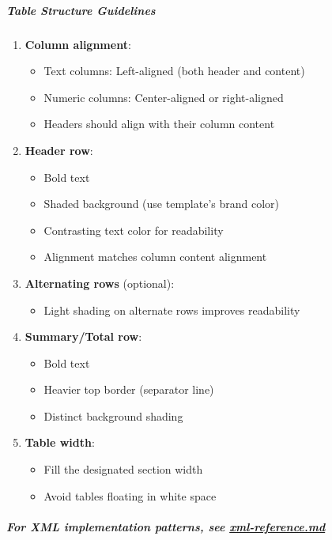 \documentclass[11pt]{article}
\begin{document}
\subparagraph{Table Structure Guidelines}\mbox{}\par

\begin{enumerate}[leftmargin=*,itemsep=2pt,topsep=2pt]
\item {} \textbf{Column alignment}:
\begin{itemize}[leftmargin=*,itemsep=2pt,topsep=2pt]
\item {} Text columns: Left-aligned (both header and content)
\item {} Numeric columns: Center-aligned or right-aligned
\item {} Headers should align with their column content
\end{itemize}
\item {} \textbf{Header row}:
\begin{itemize}[leftmargin=*,itemsep=2pt,topsep=2pt]
\item {} Bold text
\item {} Shaded background (use template's brand color)
\item {} Contrasting text color for readability
\item {} Alignment matches column content alignment
\end{itemize}
\item {} \textbf{Alternating rows} (optional):
\begin{itemize}[leftmargin=*,itemsep=2pt,topsep=2pt]
\item {} Light shading on alternate rows improves readability
\end{itemize}
\item {} \textbf{Summary/Total row}:
\begin{itemize}[leftmargin=*,itemsep=2pt,topsep=2pt]
\item {} Bold text
\item {} Heavier top border (separator line)
\item {} Distinct background shading
\end{itemize}
\item {} \textbf{Table width}:
\begin{itemize}[leftmargin=*,itemsep=2pt,topsep=2pt]
\item {} Fill the designated section width
\item {} Avoid tables floating in white space
\end{itemize}
\end{enumerate}

\subparagraph{For XML implementation patterns, see \href{xml-reference.md\#table-implementation}{\emph{xml-reference.md}}}\mbox{}\par
\end{document}

